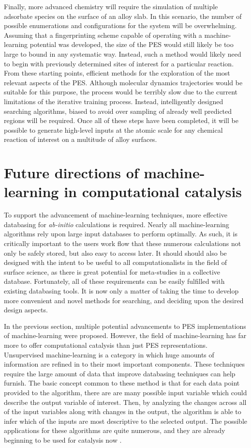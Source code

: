 \documentclass[12pt]{cmuthesis}
\begin{document}
Finally, more advanced chemistry will require the simulation of multiple adsorbate species on the surface of an alloy slab. In this scenario, the number of possible enumerations and configurations for the system will be overwhelming. Assuming that a fingerprinting scheme capable of operating with a machine-learning potential was developed, the size of the PES would still likely be too large to bound in any systematic way. Instead, such a method would likely need to begin with previously determined sites of interest for a particular reaction. From these starting points, efficient methods for the exploration of the most relevant aspects of the PES. Although molecular dynamics trajectories would be suitable for this purpose, the process would be terribly slow due to the current limitations of the iterative training process. Instead, intelligently designed searching algorithms, biased to avoid over sampling of already well predicted regions will be required. Once all of these steps have been completed, it will be possible to generate high-level inputs at the atomic scale for any chemical reaction of interest on a multitude of alloy surfaces.

\section{Future directions of machine-learning in computational catalysis}
\label{sec:org5e88e50}
To support the advancement of machine-learning techniques, more effective databasing for \emph{ab-initio} calculations is required. Nearly all machine-learning algorithms rely upon large input databases to perform optimally. As such, it is critically important to the users work flow that these numerous calculations not only be safely stored, but also easy to access later. It should should also be designed with the intent to be useful to all computationalists in the field of surface science, as there is great potential for meta-studies in a collective database. Fortunately, all of these requirements can be easily fulfilled with existing databasing tools. It is now only a matter of taking the time to develop more convenient and novel methods for searching, and deciding upon the desired design aspects.

In the previous section, multiple potential advancements to PES implementations of machine-learning were proposed. However, the field of machine-learning has far more to offer computational catalysis than just PES representations. Unsupervised machine-learning is a category in which huge amounts of information are refined in to their most important components. These techniques require the large amount of data that improve databasing techniques can help furnish. The basic concept common to these method is that for each data point provided to the algorithm, there are are many possible input variable which could describe the output variable of interest. Then, by analyzing the changes across all of the input variables along with changes in the output, the algorithm is able to infer which of the inputs are most descriptive to the selected output. The possible applications for these algorithms are quite numerous, and they are already beginning to be used for catalysis now \cite{ulissi-2017-to-addres}.
\end{document}
